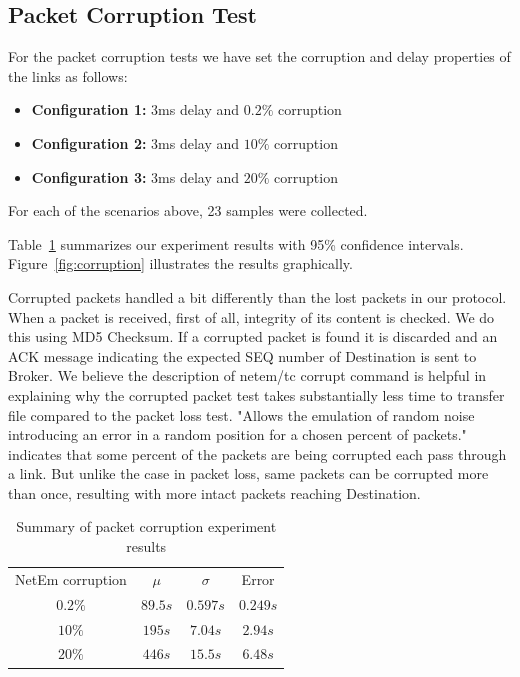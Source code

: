 \documentclass[conference]{IEEEtran}
\begin{document}
\subsection{Packet Corruption Test}\label{AA}

For the packet corruption tests we have set the corruption and delay properties of the links as follows:
\begin{itemize}
    \item \textbf{Configuration 1:} 3ms delay and $0.2\%$ corruption
    \item \textbf{Configuration 2:} 3ms delay and $10\%$ corruption
    \item \textbf{Configuration 3:} 3ms delay and $20\%$ corruption
\end{itemize}
For each of the scenarios above, 23 samples were collected.

Table~\ref{table:corruption} summarizes our experiment results with 95\% confidence intervals.
Figure~\ref{fig:corruption} illustrates the results graphically.

Corrupted packets handled a bit differently than the lost packets in our protocol. When a packet is received, first of all, integrity of its content is checked. We do this using MD5 Checksum. If a corrupted packet is found it is discarded and an ACK message indicating the expected SEQ number of Destination is sent to Broker. We believe the description of netem/tc corrupt command is helpful in explaining why the corrupted packet test takes substantially less time to transfer file compared to the packet loss test. "Allows the emulation of random noise introducing an error in a random position for a chosen percent  of packets." indicates that some percent of the packets are being corrupted each pass through a link. But unlike the case in packet loss, same packets can be corrupted more than once, resulting with more intact packets reaching Destination.

\begin{table}
    \centering
    \begin{tabular}{c c c c}
        \toprule
        NetEm corruption & $\mu$ & $\sigma$ & Error \\
        $0.2\%$   &   $89.5s$   &   $0.597s$    &   $0.249s$ \\
        $10\%$   &    $195s$   &   $7.04s$    &   $2.94s$ \\
        $20\%$   &    $446s$   &   $15.5s$    &   $6.48s$ \\
        \bottomrule
    \end{tabular}\label{table:corruption} \\
    \caption{Summary of packet corruption experiment results}\label{table:corruption}
\end{table}
\end{document}
